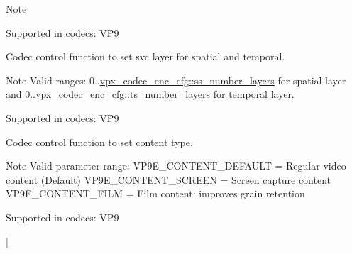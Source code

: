 \begin{Desc}
\begin{description}
\begin{DoxyNote}{Note}
\end{DoxyNote}
Supported in codecs\+: V\+P9 \item[{\em 
V\+P9\+E\+\_\+\+S\+E\+T\+\_\+\+S\+V\+C\+\_\+\+L\+A\+Y\+E\+R\+\_\+\+ID\hypertarget{group__vp8__encoder_gga6deae3d561c838952552c3d3756322eca090ad9dcb1f2eea2af60f4737c5bf514}{}\label{group__vp8__encoder_gga6deae3d561c838952552c3d3756322eca090ad9dcb1f2eea2af60f4737c5bf514}
}]Codec control function to set svc layer for spatial and temporal. \begin{DoxyNote}{Note}
Valid ranges\+: 0..\hyperlink{structvpx__codec__enc__cfg_a1e5e1d00b22f2ba8c5c7230f31900f95}{vpx\+\_\+codec\+\_\+enc\+\_\+cfg\+::ss\+\_\+number\+\_\+layers} for spatial layer and 0..\hyperlink{structvpx__codec__enc__cfg_a16d4549a30cbd585e3c3056ef873d8c7}{vpx\+\_\+codec\+\_\+enc\+\_\+cfg\+::ts\+\_\+number\+\_\+layers} for temporal layer.
\end{DoxyNote}
Supported in codecs\+: V\+P9 \item[{\em 
V\+P9\+E\+\_\+\+S\+E\+T\+\_\+\+T\+U\+N\+E\+\_\+\+C\+O\+N\+T\+E\+NT\hypertarget{group__vp8__encoder_gga6deae3d561c838952552c3d3756322eca87292610b42f00676aebdc75b63227de}{}\label{group__vp8__encoder_gga6deae3d561c838952552c3d3756322eca87292610b42f00676aebdc75b63227de}
}]Codec control function to set content type. \begin{DoxyNote}{Note}
Valid parameter range\+: V\+P9\+E\+\_\+\+C\+O\+N\+T\+E\+N\+T\+\_\+\+D\+E\+F\+A\+U\+LT = Regular video content (Default) V\+P9\+E\+\_\+\+C\+O\+N\+T\+E\+N\+T\+\_\+\+S\+C\+R\+E\+EN = Screen capture content V\+P9\+E\+\_\+\+C\+O\+N\+T\+E\+N\+T\+\_\+\+F\+I\+LM = Film content\+: improves grain retention
\end{DoxyNote}
Supported in codecs\+: V\+P9 \item[{\em 
}
\end{description}
\end{Desc}
